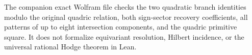 \documentclass[11pt]{article}
\begin{document}
The companion exact Wolfram file checks the two
quadratic branch identities modulo the original
quadric relation, both sign-sector recovery coefficients,
all patterns of up to eight intersection components,
and the quadric primitive square. It does not formalize
equivariant resolution, Hilbert incidence, or the
universal rational Hodge theorem in Lean.
\end{document}
